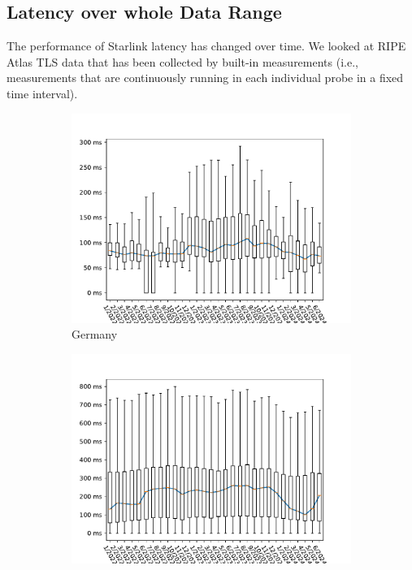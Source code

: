 \subsection{Latency over whole Data Range} \label{sec:latency-wholerange}

The performance of Starlink latency has changed over time. We looked at RIPE
Atlas TLS data that has been collected by built-in measurements (i.e.,
measurements that are continuously running in each individual probe in a fixed
time interval).

\begin{figure}
	\centering
	\begin{subfigure}[b]{0.47\linewidth}
		\includegraphics[width=\linewidth]{chapters/4-results/latency/img/latency_2022_to_2024_Germany.pdf}
		\caption{Germany}
	\end{subfigure}
	\begin{subfigure}[b]{0.47\linewidth}
		\includegraphics[width=\linewidth]{chapters/4-results/latency/img/latency_2022_to_2024_United States.pdf}

\end{subfigure}
\end{figure}

